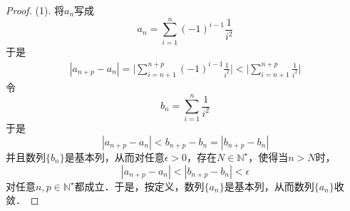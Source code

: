 \begin{proof}
(1). 将$a_n$写成
\begin{equation}
    a_n = \sum_{i=1}^n (-1)^{i-1} \frac{1}{i^2}
\end{equation}
于是
\begin{align}
    |a_{n+p}-a_n| = \Bigg\lvert\sum_{i=n+1}^{n+p} (-1)^{i-1}\frac{1}{i^2} \Bigg\rvert < \Bigg\lvert \sum_{i=n+1}^{n+p} \frac{1}{i^2} \Bigg\rvert
\end{align}
令
\begin{equation}
    b_n = \sum_{i=1}^n \frac{1}{i^2}
\end{equation}
于是
\begin{equation}
    |a_{n+p}-a_n|<b_{n+p} - b_n =|b_{n+p}-b_n|
\end{equation}
并且数列$\{ b_n \}$是基本列，从而对任意$\epsilon > 0$，存在$N \in \mathbb{N}^\star$，使得当$n > N$时，
\begin{equation}
    |a_{n+p}-a_n|<|b_{n+p}-b_n|<\epsilon
\end{equation}
对任意$n,p \in \mathbb{N}^\star$都成立．于是，按定义，数列$\{a_n\}$是基本列，从而数列$\{a_n\}$收敛．
\end{proof}

